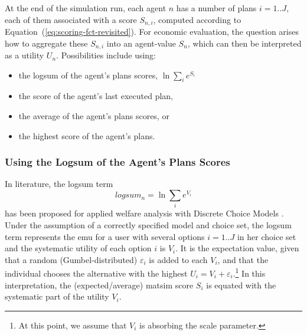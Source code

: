 At the end of the simulation run, each agent $n$ has a number of plans $i=1..J$, each of them associated with a score $S_{n,i}$, computed according to Equation~(\ref{eq:scoring-fct-revisited}).
%
%
For economic evaluation, the question arises how to aggregate these $S_{n,i}$ into an agent-value $S_n$, which can then be interpreted as a utility $U_n$. Possibilities include using:
%
\begin{itemize}\styleItemize
\item the logsum of the agent's plans scores, \ie $\ln \sum_i e^{S_i}$
\item the score of the agent's last executed plan, 
\item the average of the agent's plans scores, or
\item the highest score of the agent's plans.
\end{itemize}
%

\subsubsection{Using the Logsum of the Agent's Plans Scores}
\label{ch:economicEval:valuingBehavior:output2Eval:logsum}
In literature, the logsum term 
\[
logsum_n = \ln \sum_i e^{V_i}
\]
has been proposed for applied welfare analysis with Discrete Choice Models \citep{SmallRosen1981AppliedWelfareEconomics, deJongDalyEtAl2006logsum, KohliDaly2006LogsumEvalPRISM, deJongEtAl2007LogsumTRA}.
%
%
Under the assumption of a 
  correctly specified model and choice set,
the logsum term represents the \gls{emu} for a user with several options $i=1..J$ in her choice set and the systematic utility of each option $i$ is $V_i$.
%
It is the expectation value, given that a random (Gumbel-distributed) $\varepsilon_i$ is added to each $V_i$, and that the individual chooses the alternative with the highest $U_i = V_i + \varepsilon_i$.\footnote{%
%
At this point, we assume that $V_i$ is absorbing the scale parameter.
%
} In this interpretation, the 
(expected/average) \acrshort{matsim} score $S_i$ is equated with the systematic part of the utility $V_i$.

